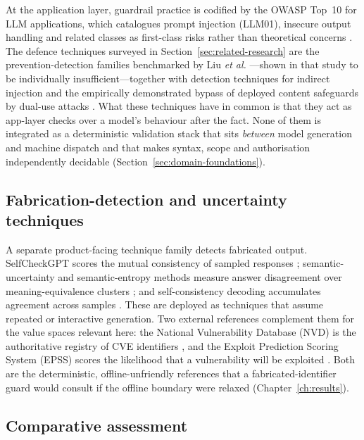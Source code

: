At the application layer, guardrail practice is codified by the OWASP Top~10 for
LLM applications, which catalogues prompt injection (LLM01), insecure output
handling and related classes as first-class risks rather than theoretical
concerns \parencite{owasp2025}. The defence techniques surveyed in
Section~\ref{sec:related-research} are the prevention-detection families
benchmarked by Liu \emph{et al.} \parencite{liu2023promptinjection}---shown in
that study to be individually insufficient---together with detection techniques
for indirect injection \parencite{greshake2023indirect} and the empirically
demonstrated bypass of deployed content safeguards by dual-use attacks
\parencite{kang2024dualuse}. What these techniques have in common is that they
act as app-layer checks over a model's behaviour after the fact. None of them is
integrated as a deterministic validation stack that sits \emph{between} model
generation and machine dispatch and that makes syntax, scope and authorisation
independently decidable (Section~\ref{sec:domain-foundations}).

\subsection*{Fabrication-detection and uncertainty techniques}

A separate product-facing technique family detects fabricated output. SelfCheckGPT
scores the mutual consistency of sampled responses \parencite{manakul2023selfcheckgpt};
semantic-uncertainty and semantic-entropy methods measure answer disagreement over
meaning-equivalence clusters \parencite{kuhn2023semantic,farquhar2024semantic};
and self-consistency decoding accumulates agreement across samples
\parencite{wang2023selfconsistency}. These are deployed as techniques that assume
repeated or interactive generation. Two external references complement them for
the value spaces relevant here: the National Vulnerability Database (NVD) is the
authoritative registry of CVE identifiers \parencite{nistnvd}, and the Exploit
Prediction Scoring System (EPSS) scores the likelihood that a vulnerability will
be exploited \parencite{firstepss}. Both are the deterministic, offline-unfriendly
references that a fabricated-identifier guard would consult if the offline
boundary were relaxed (Chapter~\ref{ch:results}).

\subsection*{Comparative assessment}

